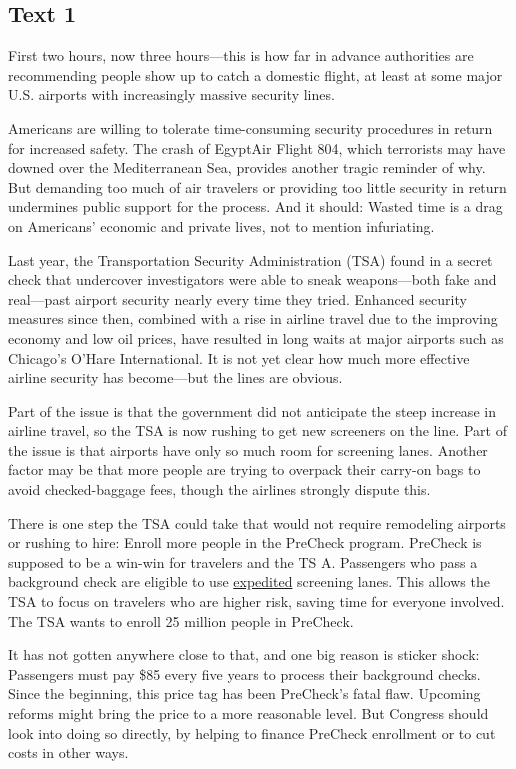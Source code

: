 \newpage
\subsection{Text 1}


First two hours, now three hours---this is how far in advance
authorities are recommending people show up to catch a domestic flight,
at least at some major U.S. airports with increasingly massive security
lines.

Americans are willing to tolerate time-consuming security procedures in
return for increased safety. The crash of EgyptAir Flight 804, which
terrorists may have downed over the Mediterranean Sea, provides another
tragic reminder of why. But demanding too much of air travelers or
providing too little security in return undermines public support for
the process. And it should: Wasted time is a drag on Americans'
economic and private lives, not to mention infuriating.

Last year, the Transportation Security Administration (TSA) found in a
secret check that undercover investigators were able to sneak
weapons---both fake and real---past airport security nearly every time
they tried. Enhanced security measures since then, combined with a rise
in airline travel due to the improving economy and low oil prices, have
resulted in long waits at major airports such as Chicago's O'Hare
International. It is not yet clear how much more effective airline
security has become---but the lines are obvious.

Part of the issue is that the government did not anticipate the steep
increase in airline travel, so the TSA is now rushing to get new
screeners on the line. Part of the issue is that airports have only so
much room for screening lanes. Another factor may be that more people
are trying to overpack their carry-on bags to avoid checked-baggage
fees, though the airlines strongly dispute this.

There is one step the TSA could take that would not require remodeling
airports or rushing to hire: Enroll more people in the PreCheck program.
PreCheck is supposed to be a win-win for travelers and the TS
A.
Passengers who pass a background check are eligible to use
\uline{expedited} screening lanes. This allows the TSA to focus on
travelers who are higher risk, saving time for everyone involved. The
TSA wants to enroll 25 million people in PreCheck.

It has not gotten anywhere close to that, and one big reason is sticker
shock: Passengers must pay \$85 every five years to process their
background checks. Since the beginning, this price tag has been
PreCheck's fatal flaw. Upcoming reforms might bring the price to a more
reasonable level. But Congress should look into doing so directly, by
helping to finance PreCheck enrollment or to cut costs in other ways.

